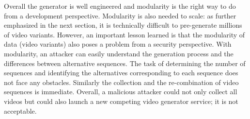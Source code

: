 Overall the generator is well engineered and modularity is the right way to do from a development perspective. 
Modularity is also needed to scale: as further emphasized in the next section, it is technically difficult to pre-generate millions of video variants.   
However, an important lesson learned is that the modularity of data (video variants) also poses a problem from a security perspective.  
With modularity, an attacker can easily understand the generation process and the differences between alternative sequences. The task of determining the number of sequences and identifying the alternatives corresponding to each sequence does not face any obstacles. Similarly the collection and the re-combination of video sequences is immediate. Overall, a malicious attacker could not only collect all videos but could also launch a new competing video generator service; it is not acceptable.




